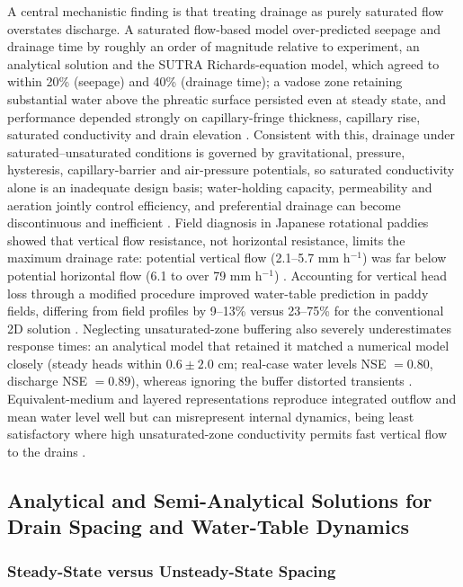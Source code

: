 \documentclass[11pt]{article}
\begin{document}
A central mechanistic finding is that treating drainage as purely saturated flow overstates discharge. A saturated flow-based model over-predicted seepage and drainage time by roughly an order of magnitude relative to experiment, an analytical solution and the SUTRA Richards-equation model, which agreed to within 20\% (seepage) and 40\% (drainage time); a vadose zone retaining substantial water above the phreatic surface persisted even at steady state, and performance depended strongly on capillary-fringe thickness, capillary rise, saturated conductivity and drain elevation \parencite{Xin2016b}. Consistent with this, drainage under saturated--unsaturated conditions is governed by gravitational, pressure, hysteresis, capillary-barrier and air-pressure potentials, so saturated conductivity alone is an inadequate design basis; water-holding capacity, permeability and aeration jointly control efficiency, and preferential drainage can become discontinuous and inefficient \parencite{Li2021}. Field diagnosis in Japanese rotational paddies showed that vertical flow resistance, not horizontal resistance, limits the maximum drainage rate: potential vertical flow (2.1--5.7 mm h$^{-1}$) was far below potential horizontal flow (6.1 to over 79 mm h$^{-1}$) \parencite{Nishida2020}. Accounting for vertical head loss through a modified procedure improved water-table prediction in paddy fields, differing from field profiles by 9--13\% versus 23--75\% for the conventional 2D solution \parencite{Talukolaee2022}. Neglecting unsaturated-zone buffering also severely underestimates response times: an analytical model that retained it matched a numerical model closely (steady heads within $0.6\pm2.0$ cm; real-case water levels NSE $=0.80$, discharge NSE $=0.89$), whereas ignoring the buffer distorted transients \parencite{VandeCraats2021}. Equivalent-medium and layered representations reproduce integrated outflow and mean water level well but can misrepresent internal dynamics, being least satisfactory where high unsaturated-zone conductivity permits fast vertical flow to the drains \parencite{Carlier2007}.

\subsection{Analytical and Semi-Analytical Solutions for Drain Spacing and Water-Table Dynamics}

\subsubsection{Steady-State versus Unsteady-State Spacing}
\end{document}
